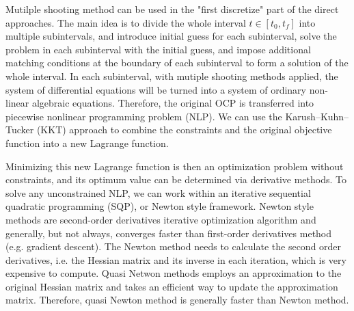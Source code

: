 \documentclass  [
  paper    = a4,
  BCOR     = 10mm,
  twoside,
  fontsize = 12pt,
  fleqn,
  toc      = bibnumbered,
  toc      = listofnumbered,
  numbers  = noendperiod,
  headings = normal,
  listof   = leveldown,
  version  = 3.03
]                                       {scrreprt}
\newcommand{\<}{\langle}
\renewcommand{\>}{\rangle}
\begin{document}
Mutilple shooting method can be used in the "first discretize" part of the direct approaches. The main idea is to divide the whole interval $t \in [t_0, t_f]$ into multiple subintervals, and introduce initial guess for each subinterval,  solve the problem in each subinterval with the initial guess, and impose additional matching conditions at the boundary of each subinterval to form a solution of the whole interval. In each subinterval, with mutiple shooting methods applied, the system of differential equations will be turned into a system of ordinary non-linear algebraic equations. Therefore, the original OCP is transferred into piecewise nonlinear programming problem (NLP). We can use the Karush–Kuhn–Tucker (KKT) approach to combine the constraints and the original objective function into a new Lagrange function. 

Minimizing this new Lagrange function is then an optimization problem without constraints, and its optimum value can be determined via derivative methods. To solve any unconstrained NLP, we can work within an iterative sequential quadratic programming (SQP), or Newton style framework. Newton style methods are second-order derivatives iterative optimization algorithm and generally, but not always, converges faster than first-order derivatives method (e.g. gradient descent). The Newton method needs to calculate the second order derivatives, i.e. the Hessian matrix and its inverse in each iteration, which is very expensive to compute. Quasi Netwon methods employs an approximation to the original Hessian matrix and takes an efficient way to update the approximation matrix. Therefore, quasi Newton method is generally faster than Newton method. 

\end{document}
